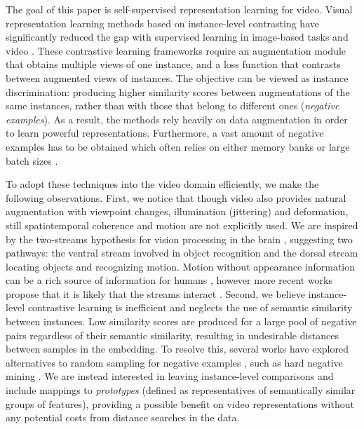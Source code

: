 \documentclass[10pt,twocolumn,letterpaper]{article}
\begin{document}
The goal of this paper is self-supervised representation learning for video. Visual representation learning methods based on instance-level contrasting have significantly reduced the gap with supervised learning in image-based tasks \cite{chen_simple_2020, he_momentum_2020, oord_representation_2019} and video \cite{qian_spatiotemporal_2021,  han_self-supervised_2020}. These contrastive learning frameworks require an augmentation module that obtains multiple views of one instance, and a loss function that contrasts between augmented views of instances. The objective can be viewed as instance discrimination: producing higher similarity scores between augmentations of the same instances, rather than with those that belong to different ones (\textit{negative examples}). As a result, the methods rely heavily on data augmentation in order to learn powerful representations. Furthermore, a vast amount of negative examples has to be obtained which often relies on either memory banks \cite{he_momentum_2020} or large batch sizes \cite{chen_simple_2020}. 

To adopt these techniques into the video domain efficiently, we make the following observations. First, we notice that though video also provides natural augmentation with viewpoint changes, illumination (jittering) and deformation, still spatiotemporal coherence and motion are not explicitly used. We are inspired by the two-streams hypothesis for vision processing in the brain \cite{schneider_two_1969, GoodaleMelvynA1992Svpf}, suggesting two pathways: the ventral stream involved in object recognition and the dorsal stream locating objects and recognizing motion. Motion without appearance information can be a rich source of information for humans \cite{JohanssonGunnar1973Vpob}, however more recent works propose that it is likely that the streams interact \cite{McIntoshRobertD2009Tvsf}. Second, we believe instance-level contrastive learning is inefficient and neglects the use of semantic similarity between instances. Low similarity scores are produced for a large pool of negative pairs regardless of their semantic similarity, resulting in undesirable distances between samples in the embedding. To resolve this, several works have explored alternatives to random sampling for negative examples \cite{cao_parametric_2020, chuang_debiased_2020}, such as hard negative mining \cite{kalantidis_hard_2020-1, robinson_contrastive_2021}. We are instead interested in leaving instance-level comparisons and include mappings to \textit{prototypes} (defined as representatives of semantically similar groups of features), providing a possible benefit on video representations without any potential costs from distance searches in the data.
\end{document}
